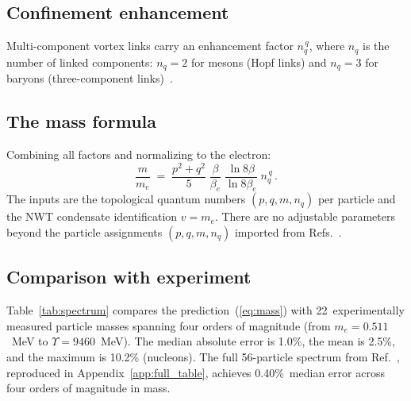 \documentclass[11pt]{article}
\begin{document}
\subsection{Confinement enhancement}

Multi-component vortex links carry an enhancement factor
$n_q^{\,q}$, where $n_q$ is the number of linked components:
$n_q = 2$ for mesons (Hopf links) and $n_q = 3$ for baryons
(three-component links)~\cite{NWT6}.

\subsection{The mass formula}

Combining all factors and normalizing to the electron:
\begin{equation}
\boxed{\;
\frac{m}{m_e} \;=\; \frac{p^2+q^2}{5}\;
    \frac{\beta}{\beta_e}\;
    \frac{\ln 8\beta}{\ln 8\beta_e}\;
    n_q^{\,q}\,.
\;}
\label{eq:mass}
\end{equation}
The inputs are the topological quantum numbers $(p,q,m,n_q)$ per
particle and the NWT condensate identification $v = m_e$.  There are
no adjustable parameters beyond the particle assignments $(p,q,m,n_q)$
imported from Refs.~\cite{NWT1,NWT6}.

\subsection{Comparison with experiment}
\label{sec:test}

Table~\ref{tab:spectrum} compares the prediction~(\ref{eq:mass}) with
22~experimentally measured particle masses spanning four orders of
magnitude (from $m_e = 0.511$~MeV to $\Upsilon = 9460$~MeV).  The
median absolute error is 1.0\%, the mean is 2.5\%, and the maximum
is 10.2\% (nucleons).  The full 56-particle spectrum from Ref.~\cite{NWT6}, reproduced
in Appendix~\ref{app:full_table}, achieves 0.40\%~median error
across four orders of magnitude in mass.
\end{document}
